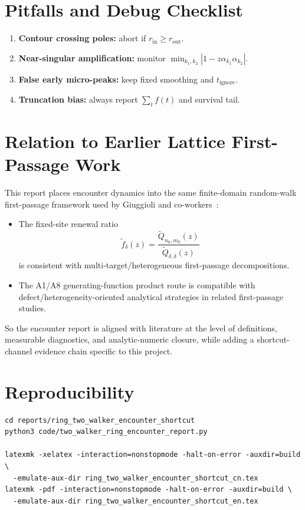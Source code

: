 \documentclass[11pt]{article}
\newcommand{\TabDir}{tables}
\begin{document}
\begin{table}[H]
  \centering
  \caption{Shortcut scan metrics and phase labels.}
  \label{tab:scan}
  
\end{table}

\section{Pitfalls and Debug Checklist}
\begin{enumerate}[leftmargin=1.4em]
  \item \textbf{Contour crossing poles:} abort if $r_{\mathrm{in}}\ge r_{\mathrm{out}}$.
  \item \textbf{Near-singular amplification:} monitor $\min_{k_1,k_2}|1-z\alpha_{k_1}\alpha_{k_2}|$.
  \item \textbf{False early micro-peaks:} keep fixed smoothing and $t_{\mathrm{ignore}}$.
  \item \textbf{Truncation bias:} always report $\sum_t f(t)$ and survival tail.
\end{enumerate}

\section{Relation to Earlier Lattice First-Passage Work}
This report places encounter dynamics into the same finite-domain random-walk first-passage framework used by Giuggioli and co-workers~\cite{sarvaharman2020pre,giuggioli2024multi}:
\begin{itemize}[leftmargin=1.4em]
  \item The fixed-site renewal ratio
  \[
  \widetilde f_\delta(z)=\frac{\widetilde Q_{n_0,m_0}(z)}{\widetilde Q_{\delta,\delta}(z)}
  \]
  is consistent with multi-target/heterogeneous first-passage decompositions\cite{giuggioli2024multi}.
  \item The A1/A8 generating-function product route is compatible with defect/heterogeneity-oriented analytical strategies in related first-passage studies\cite{sarvaharman2020pre}.
\end{itemize}
So the encounter report is aligned with literature at the level of definitions, measurable diagnostics, and analytic-numeric closure, while adding a shortcut-channel evidence chain specific to this project.

\section{Reproducibility}
\begin{verbatim}
cd reports/ring_two_walker_encounter_shortcut
python3 code/two_walker_ring_encounter_report.py

latexmk -xelatex -interaction=nonstopmode -halt-on-error -auxdir=build \
  -emulate-aux-dir ring_two_walker_encounter_shortcut_cn.tex
latexmk -pdf -interaction=nonstopmode -halt-on-error -auxdir=build \
  -emulate-aux-dir ring_two_walker_encounter_shortcut_en.tex
\end{verbatim}
\end{document}
